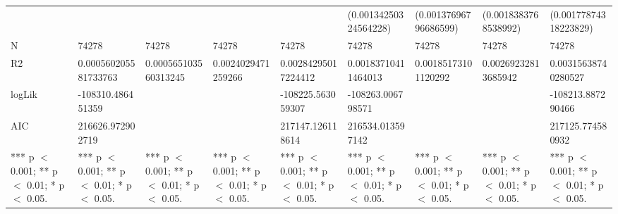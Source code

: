 \begin{table}[ht]
\begin{tabular}{lllllllll}
   &  &  &  &  & (0.00134250324564228) & (0.00137696796686599) & (0.0018383768538992) & (0.00177874318223829) \\ 
  N & 74278 & 74278 & 74278 & 74278 & 74278 & 74278 & 74278 & 74278 \\ 
  R2 & 0.000560205581733763 & 0.000565103560313245 & 0.0024029471259266 & 0.00284295017224412 & 0.00183710411464013 & 0.00185173101120292 & 0.00269232813685942 & 0.00315638740280527 \\ 
  logLik & -108310.486451359 &  &  & -108225.563059307 & -108263.006798571 &  &  & -108213.887290466 \\ 
  AIC & 216626.972902719 &  &  & 217147.126118614 & 216534.013597142 &  &  & 217125.774580932 \\ 
   *** p $<$ 0.001;  ** p $<$ 0.01;  * p $<$ 0.05. &  *** p $<$ 0.001;  ** p $<$ 0.01;  * p $<$ 0.05. &  *** p $<$ 0.001;  ** p $<$ 0.01;  * p $<$ 0.05. &  *** p $<$ 0.001;  ** p $<$ 0.01;  * p $<$ 0.05. &  *** p $<$ 0.001;  ** p $<$ 0.01;  * p $<$ 0.05. &  *** p $<$ 0.001;  ** p $<$ 0.01;  * p $<$ 0.05. &  *** p $<$ 0.001;  ** p $<$ 0.01;  * p $<$ 0.05. &  *** p $<$ 0.001;  ** p $<$ 0.01;  * p $<$ 0.05. &  *** p $<$ 0.001;  ** p $<$ 0.01;  * p $<$ 0.05. \\ 
   \hline
\end{tabular}
\end{table}
